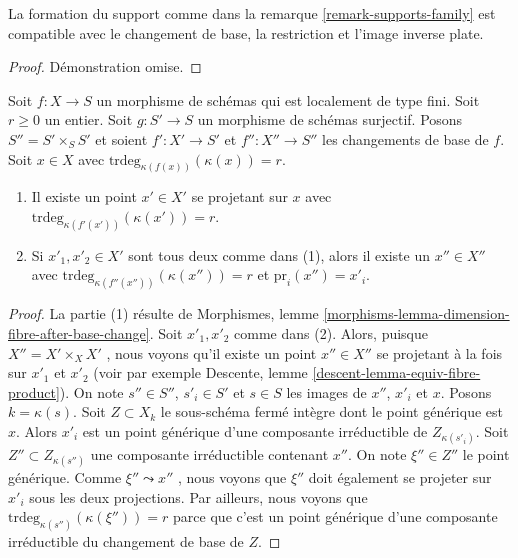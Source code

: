 \begin{lemma} 
\label{lemma-support-family} La 
formation du support comme dans la remarque  \ref{remark-supports-family}  est 
compatible avec le changement de base, la restriction et l'image inverse plate. 
\end{lemma} 

\begin{proof} 
Démonstration omise. 
\end{proof} 

\begin{lemma} 
\label{lemma-coequalizer-dim-r} 
Soit  $f : X \to S$  un morphisme de schémas qui est localement de type fini. 
Soit $r \geq 0$  un entier. Soit  $g : S' \to S$  un morphisme de schémas 
surjectif. Posons  $S'' = S' \times_S S'$  et soient  $f' : X' \to S'$
  et  $f'' : X'' \to S''$  les changements de base de  $f$. 
Soit  $x \in X$  avec  $\text{trdeg}_{\kappa(f(x))}(\kappa(x)) = r$. 
\begin{enumerate} 
\item Il existe un point $x' \in X'$ se projetant sur $x$
  avec  $\text{trdeg}_{\kappa(f'(x'))}(\kappa(x')) = r$. 
\item Si  $x'_1, x'_2 \in X'$  sont tous deux comme dans (1), alors 
il existe un  $x'' \in X''$ avec  
$\text{trdeg}_{\kappa(f''(x''))}(\kappa(x'')) = r$  et  
$\text{pr}_i(x'') = x'_i$. 
\end{enumerate} 
\end{lemma} 

\begin{proof} La
 partie (1) résulte
 de Morphismes, lemme  \ref{morphisms-lemma-dimension-fibre-after-base-change}. 
Soit  $x'_1, x'_2$  comme dans (2). Alors, puisque  $X'' = X' \times_X X'$
 , nous voyons qu'il 
existe un point $x'' \in X''$ se projetant à la fois sur  $x'_1$  et  $x'_2$  (voir par
 exemple Descente, lemme \ref{descent-lemma-equiv-fibre-product}). On
 note  $s'' \in S''$,  $s'_i \in S'$ et  $s \in S$  les images 
de $x''$,  $x'_i$ et  $x$.
 Posons  $k = \kappa(s)$. Soit $Z \subset X_k$  le sous-schéma 
fermé intègre dont le point générique est $x$. Alors  $x'_i$
  est un point générique d'une composante irréductible de  $Z_{\kappa(s'_i)}$. 
Soit  $Z'' \subset Z_{\kappa(s'')}$  une composante irréductible
 contenant  $x''$. On note  $\xi'' \in Z''$  le point générique.
 Comme $\xi'' \leadsto x''$ , nous voyons que  $\xi''$  doit également se
 projeter sur $x'_i$ sous les deux projections. Par ailleurs, nous 
voyons que  $\text{trdeg}_{\kappa(s'')}(\kappa(\xi'')) = r$
  parce que c'est un point 
générique d'une composante irréductible du changement de base de $Z$. 
\end{proof} 

